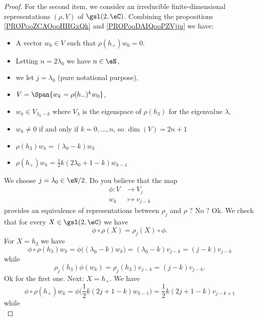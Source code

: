 \begin{proof}
	For the second item, we consider an irreducible finite-dimensional representations \( (\rho,V)\) of \( \gsl(2,\eC)\). Combining the propositions  \ref{PROPooZCAOooHHGxQk} and \ref{PROPooDAIQooPZVjju} we have:
	\begin{itemize}
		\item A vector \( w_0\in V\) such that \( \rho(h_+)w_0=0\).
		\item Letting \( n=2\lambda_0\) we have \( n\in \eN\),
		\item we let \( j=\lambda_0\) (pure notational purpose),
		\item \( V=\Span\{ w_k=\rho(h_-)^kw_0 \}\),
		\item  \( w_k\in V_{\lambda_0-k}\) where \( V_{\lambda}\) is the eigenspace of \( \rho(h_3)\) for the eigenvalue \( \lambda\),
		\item \( w_k\neq 0\) if and only if \( k=0,\ldots, n\), so \( \dim(V)=2n+1\)
		\item \( \rho(h_3)w_k=(\lambda_0-k)w_k\)
		\item \( \rho(h_+)w_k=\frac{ 1 }{2}k(2\lambda_0+1-k)w_{k-1}\)
	\end{itemize}
	We choose \( j=\lambda_0\in \eN/2\). Do you believe that the map
	\begin{equation}
		\begin{aligned}
			\phi\colon V & \to V_j         \\
			w_k          & \mapsto v_{j-k}
		\end{aligned}
	\end{equation}
	provides an equivalence of representations between \( \rho_j\) and \( \rho\) ? No ? Ok. We check that for every \( X\in \gsl(2,\eC)\) we have
	\begin{equation}
		\phi\circ\rho(X)=\rho_j(X)\circ \phi.
	\end{equation}
	For \( X=h_3\) we have
	\begin{equation}
		\phi\circ\rho(h_3)w_k=\phi\big( (\lambda_0-k)w_k \big)=(\lambda_0-k)v_{j-k}=(j-k)v_{j-k}
	\end{equation}
	while
	\begin{equation}
		\rho_j(h_3)\phi(w_k)=\rho_j(h_3)v_{j-k}=(j-k)v_{j-k}.
	\end{equation}
	Ok for the first one. Next: \( X=h_+\). We have
	\begin{equation}
		\phi\circ\rho(h_+)w_k=\phi\big( \frac{ 1 }{2}k(2j+1-k)w_{k-1} \big)=\frac{ 1 }{2}k(2j+1-k)v_{j-k+1}
	\end{equation}
	while
	\begin{equation}

\end{equation}
\end{proof}
